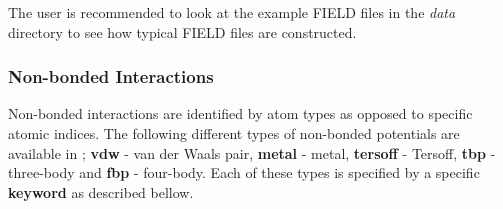 The user is recommended to look at the example FIELD files in the {\em
data} directory to see how typical FIELD files are constructed.

\subsubsection*{Non-bonded Interactions}

Non-bonded interactions are identified by atom types as opposed to
specific atomic indices.  The following different types of
non-bonded potentials are available in
\D; {\bf vdw} - van der Waals pair,
{\bf metal} - metal, {\bf tersoff} -
Tersoff, {\bf tbp} -
three-body and {\bf fbp} -
four-body.  Each of these types is
specified by a specific {\bf keyword} as described bellow.

